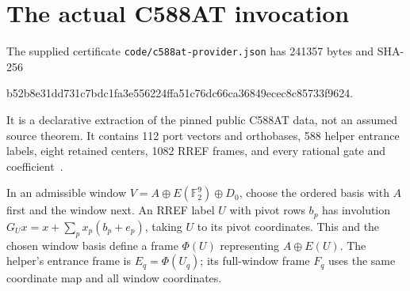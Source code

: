 \documentclass[11pt]{amsart}
\theoremstyle{remark}
\newcommand{\F}{\mathbb F_2}
\begin{document}
\section{The actual C588AT invocation}
The supplied certificate \texttt{code/c588at-provider.json} has 241357
bytes and SHA-256
\begin{center}\footnotesize\ttfamily
b52b8e31dd731c7bdc1fa3e556224ffa51c76dc66ca36849ecec8c85733f9624.
\end{center}
It is a declarative extraction of the pinned public C588AT data, not an
assumed source theorem. It contains 112 port vectors and orthobases,
588 helper entrance labels, eight retained centers, 1082 RREF frames,
and every rational gate and coefficient~\cite{VerifierPackage2026}.

In an admissible window $V=A\oplus E(\F^9)\oplus D_0$, choose the ordered
basis with $A$ first and the window next. An RREF label $U$ with pivot
rows $b_p$ has involution $G_Ux=x+\sum_p x_p(b_p+e_p)$, taking $U$
to its pivot coordinates. This and the chosen window basis define a
frame $\Phi(U)$ representing $A\oplus E(U)$. The helper's entrance
frame is $E_q=\Phi(U_q)$; its full-window frame $F_q$ uses the same
coordinate map and all window coordinates.
\end{document}
